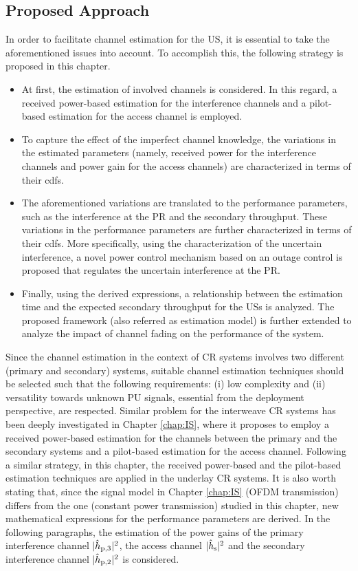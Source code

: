 \subsection{Proposed Approach} 
In order to facilitate channel estimation for the US, it is essential to take the aforementioned issues into account. To accomplish this, the following strategy is proposed in this chapter.
\begin{itemize}
\item At first, the estimation of involved channels is considered. In this regard, a received power-based estimation for the interference channels and a pilot-based estimation for the access channel is employed. 
\item To capture the effect of the imperfect channel knowledge, the variations in the estimated parameters (namely, received power for the interference channels and power gain for the access channels) are characterized in terms of their cdfs.
\item The aforementioned variations are translated to the performance parameters, such as the interference at the PR and the secondary throughput. These variations in the performance parameters are further characterized in terms of their cdfs. More specifically, using the characterization of the uncertain interference, a novel power control mechanism based on an outage control is proposed that regulates the uncertain interference at the PR.  
\item Finally, using the derived expressions, a relationship between the estimation time and the expected secondary throughput for the USs is analyzed. The proposed framework (also referred as estimation model) is further extended to analyze the impact of channel fading on the performance of the system. 
\end{itemize}
Since the channel estimation in the context of CR systems involves two different (primary and secondary) systems, suitable channel estimation techniques should be selected such that the following requirements: (i) low complexity and (ii) versatility towards unknown PU signals, essential from the deployment perspective, are respected. Similar problem for the interweave CR systems has been deeply investigated in Chapter \ref{chap:IS}, where it proposes to employ a received power-based estimation for the channels between the primary and the secondary systems and a pilot-based estimation for the access channel. Following a similar strategy, in this chapter, the received power-based and the pilot-based estimation techniques are applied in the underlay CR systems. It is also worth stating that, since the signal model in Chapter \ref{chap:IS} (OFDM transmission) differs from the one (constant power transmission) studied in this chapter, new mathematical expressions for the performance parameters are derived. In the following paragraphs, the estimation of the power gains of the primary interference channel $|\hat{h}_{\text{p,3}}|^2$, the access channel $|\hat{h}_{\text{s}}|^2$ and the secondary interference channel $|\hat{h}_{\text{p,2}}|^2$ is considered. 
